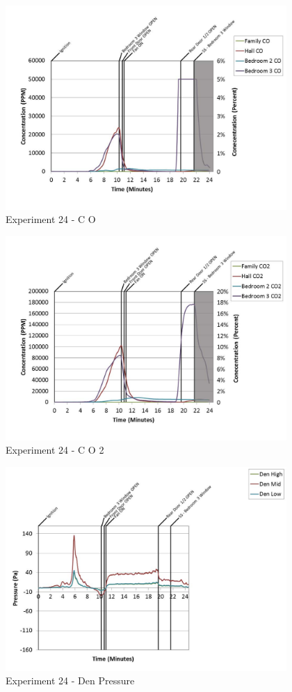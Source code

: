 \documentclass{article}
\begin{document}
\begin{appendices}
	\begin{figure}[h!]
		\centering
		\includegraphics[height=3.05in]{0_Images/Results_Charts/Exp_24_Charts/CO.pdf}
		\caption{Experiment 24 - C O}
	\end{figure}
 
	\clearpage

	\begin{figure}[h!]
		\centering
		\includegraphics[height=3.05in]{0_Images/Results_Charts/Exp_24_Charts/CO2.pdf}
		\caption{Experiment 24 - C O 2}
	\end{figure}
 

	\begin{figure}[h!]
		\centering
		\includegraphics[height=3.05in]{0_Images/Results_Charts/Exp_24_Charts/DenPressure.pdf}
		\caption{Experiment 24 - Den Pressure}
	\end{figure}
 

\end{appendices}
\end{document}
